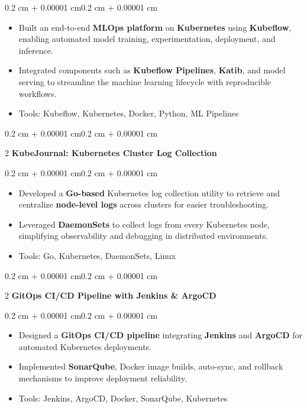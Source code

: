 \documentclass[10pt, letterpaper]{article}
\newenvironment{highlights}{\begin{itemize}[topsep=0.10 cm,parsep=0.10 cm,partopsep=0pt,itemsep=0pt,leftmargin=0.4 cm + 10pt]}{\end{itemize}}
\newenvironment{onecolentry}{\begin{adjustwidth}{0.2 cm + 0.00001 cm}{0.2 cm + 0.00001 cm}}{\end{adjustwidth}}
\newenvironment{twocolentry}[2][]{\onecolentry\def\secondColumn{#2}\setcolumnwidth{\fill, 4.5 cm}\begin{paracol}{2}}{\switchcolumn \raggedleft \secondColumn\end{paracol}\endonecolentry}
\let\hrefWithoutArrow\href
\renewcommand{\href}[2]{\hrefWithoutArrow{#1}{\ifthenelse{\equal{#2}{}}{ }{#2 }\raisebox{.15ex}{\footnotesize \faExternalLink*}}}
\begin{document}
\begin{onecolentry}
\begin{highlights}

\item Built an end-to-end \textbf{MLOps platform} on \textbf{Kubernetes} using \textbf{Kubeflow}, enabling automated model training, experimentation, deployment, and inference.

\item Integrated components such as \textbf{Kubeflow Pipelines}, \textbf{Katib}, and model serving to streamline the machine learning lifecycle with reproducible workflows.

\item Tools: Kubeflow, Kubernetes, Docker, Python, ML Pipelines

\end{highlights}
\end{onecolentry}


\begin{twocolentry}{\textit{\href{https://github.com/sachin21212121/kubejournal}{github}}}
\textbf{KubeJournal: Kubernetes Cluster Log Collection}
\end{twocolentry}

\begin{onecolentry}
\begin{highlights}

\item Developed a \textbf{Go-based} Kubernetes log collection utility to retrieve and centralize \textbf{node-level logs} across clusters for easier troubleshooting.

\item Leveraged \textbf{DaemonSets} to collect logs from every Kubernetes node, simplifying observability and debugging in distributed environments.

\item Tools: Go, Kubernetes, DaemonSets, Linux

\end{highlights}
\end{onecolentry}

\begin{twocolentry}{\textit{\href{https://github.com/sachin21212121/jenkins-end-to-end-cicd-using-argocd.git}{github}}}
\textbf{GitOps CI/CD Pipeline with Jenkins \& ArgoCD}
\end{twocolentry}

\begin{onecolentry}
\begin{highlights}

\item Designed a \textbf{GitOps CI/CD pipeline} integrating \textbf{Jenkins} and \textbf{ArgoCD} for automated Kubernetes deployments.

\item Implemented \textbf{SonarQube}, Docker image builds, auto-sync, and rollback mechanisms to improve deployment reliability.

\item Tools: Jenkins, ArgoCD, Docker, SonarQube, Kubernetes

\end{highlights}
\end{onecolentry}
\end{document}
